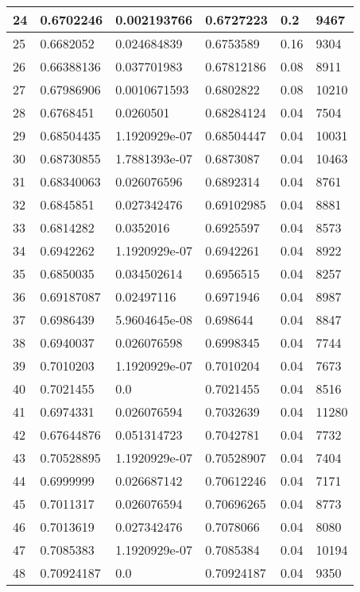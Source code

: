\begin{longtable}{|l|l|l|l|l|l|}
24 & 0.6702246 & 0.002193766 & 0.6727223 & 0.2 & 9467 \\ \hline 
25 & 0.6682052 & 0.024684839 & 0.6753589 & 0.16 & 9304 \\ \hline 
26 & 0.66388136 & 0.037701983 & 0.67812186 & 0.08 & 8911 \\ \hline 
27 & 0.67986906 & 0.0010671593 & 0.6802822 & 0.08 & 10210 \\ \hline 
28 & 0.6768451 & 0.0260501 & 0.68284124 & 0.04 & 7504 \\ \hline 
29 & 0.68504435 & 1.1920929e-07 & 0.68504447 & 0.04 & 10031 \\ \hline 
30 & 0.68730855 & 1.7881393e-07 & 0.6873087 & 0.04 & 10463 \\ \hline 
31 & 0.68340063 & 0.026076596 & 0.6892314 & 0.04 & 8761 \\ \hline 
32 & 0.6845851 & 0.027342476 & 0.69102985 & 0.04 & 8881 \\ \hline 
33 & 0.6814282 & 0.0352016 & 0.6925597 & 0.04 & 8573 \\ \hline 
34 & 0.6942262 & 1.1920929e-07 & 0.6942261 & 0.04 & 8922 \\ \hline 
35 & 0.6850035 & 0.034502614 & 0.6956515 & 0.04 & 8257 \\ \hline 
36 & 0.69187087 & 0.02497116 & 0.6971946 & 0.04 & 8987 \\ \hline 
37 & 0.6986439 & 5.9604645e-08 & 0.698644 & 0.04 & 8847 \\ \hline 
38 & 0.6940037 & 0.026076598 & 0.6998345 & 0.04 & 7744 \\ \hline 
39 & 0.7010203 & 1.1920929e-07 & 0.7010204 & 0.04 & 7673 \\ \hline 
40 & 0.7021455 & 0.0 & 0.7021455 & 0.04 & 8516 \\ \hline 
41 & 0.6974331 & 0.026076594 & 0.7032639 & 0.04 & 11280 \\ \hline 
42 & 0.67644876 & 0.051314723 & 0.7042781 & 0.04 & 7732 \\ \hline 
43 & 0.70528895 & 1.1920929e-07 & 0.70528907 & 0.04 & 7404 \\ \hline 
44 & 0.6999999 & 0.026687142 & 0.70612246 & 0.04 & 7171 \\ \hline 
45 & 0.7011317 & 0.026076594 & 0.70696265 & 0.04 & 8773 \\ \hline 
46 & 0.7013619 & 0.027342476 & 0.7078066 & 0.04 & 8080 \\ \hline 
47 & 0.7085383 & 1.1920929e-07 & 0.7085384 & 0.04 & 10194 \\ \hline 
48 & 0.70924187 & 0.0 & 0.70924187 & 0.04 & 9350 \\ \hline 

\end{longtable}
